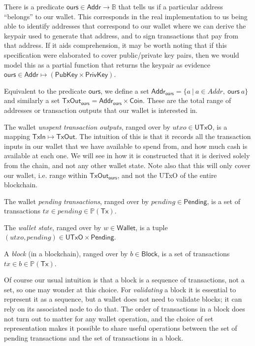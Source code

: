 \documentclass{article}
\newcommand{\powerset}[1]{\mathbb{P}(#1)}
\begin{document}
There is a predicate $\mathsf{ours} \in \mathsf{Addr} \to \mathbb{B}$
that tells us if a particular address ``belongs'' to our wallet.
This corresponds in the real implementation to us being able to identify
addresses that correspond to our wallet where we can derive the keypair used
to generate that address, and to sign transactions that pay from that address.
If it aids comprehension, it may be worth noting that if this specification
were elaborated to cover public/private key pairs, then we would model this as
a partial function that returns the keypair as evidence
$\mathsf{ours} \in \mathsf{Addr} \mapsto (\mathsf{PubKey} \times \mathsf{PrivKey})$.

Equivalent to the predicate $\mathsf{ours}$, we define a set
$\mathsf{Addr_{ours}} = \{ a ~|~ a \in Addr, ~ \mathsf{ours} ~ a \}$ and
similarly a set
$\mathsf{TxOut_{ours}} = \mathsf{Addr_{ours}} \times \mathsf{Coin}$. These are
the total range of addresses or transaction outputs that our wallet is
interested in.

The wallet \emph{unspent transaction outputs}, ranged over by
$utxo \in \mathsf{UTxO}$, is a mapping $\mathsf{TxIn} \mapsto \mathsf{TxOut}$.
The intuition of this is that it records all the transaction inputs in our
wallet that we have available to spend from, and how much cash is available at
each one. We will see in how it is constructed that it is derived solely from
the chain, and not any other wallet state. Note also that this will only cover
our wallet, i.e. range within $\mathsf{TxOut_{ours}}$, and not the UTxO of the
entire blockchain.

The wallet \emph{pending transactions}, ranged over by
$pending \in \mathsf{Pending}$, is a set of transactions
$tx \in pending \in \powerset{\mathsf{Tx}}$.

The \emph{wallet state}, ranged over by $w \in \mathsf{Wallet}$, is a tuple
$(utxo, pending) \in \mathsf{UTxO} \times \mathsf{Pending}$.

A \emph{block} (in a blockchain), ranged over by $b \in \mathsf{Block}$, is a
set of transactions $tx \in b \in \powerset{\mathsf{Tx}}$.

Of course our usual intuition is that a block is a sequence of transactions,
not a set, so one may wonder at this choice. For \emph{validating} a block it
is essential to represent it as a sequence, but a wallet does not need to
validate blocks; it can rely on its associated node to do that. The order of
transactions in a block does not turn out to matter for any wallet operation,
and the choice of set representation makes it possible to share useful
operations between the set of pending transactions and the set of transactions
in a block.
\end{document}
